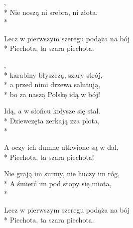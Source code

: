 \begin{lyrics}[longestline={Nie noszą lampasów, lecz szary ich strój,..}]

,\\*
Nie noszą ni srebra, ni złota.\\*
\begin{markverses}%
Lecz w pierwszym szeregu podąża na bój\\*
Piechota, ta szara piechota.
\end{markverses}

\begin{chorus}
,\\*
karabiny błyszczą, szary strój,\\*
a przed nimi drzewa salutują,\\*
bo za naszą Polskę idą w bój!
\end{chorus}

Idą, a w słońcu kołysze się stal.\\*
Dziewczęta zerkają zza plota,\\*
\begin{markverses}%
A oczy ich dumne utkwione są w dal,\\*
Piechota, ta szara piechota!
\end{markverses}

\chorusref

Nie grają im surmy, nie huczy im róg,\\*
A śmierć im pod stopy się miota,\\*
\begin{markverses}%
Lecz w pierwszym szeregu podąża na bój\\*
Piechota, ta szara piechota.
\end{markverses}

\chorusref
\end{lyrics}




